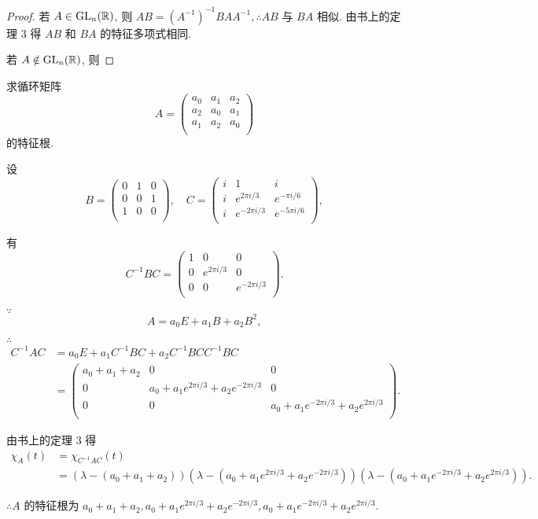 \documentclass{ctexart}
\begin{document}
\begin{proof}
    若 $A\in\operatorname{GL} _n(\mathbb{R})$, 则 $AB=(A^{-1})^{-1}BAA^{-1},\therefore AB$ 与 $BA$ 相似. 由书上的定理 3 得 $AB$ 和 $BA$ 的特征多项式相同.

    若 $A\notin\operatorname{GL} _n(\mathbb{R})$, 则 %
\end{proof}
\begin{exercise}%
    求循环矩阵
    \[A=\begin{pmatrix}
        a_0 & a_1 & a_2 \\
        a_2 & a_0 & a_1 \\
        a_1 & a_2 & a_0 \\
    \end{pmatrix}\]
    的特征根.
\end{exercise}
\begin{solution}
    设
    \[B=\begin{pmatrix}
        0 & 1 & 0 \\
        0 & 0 & 1 \\
        1 & 0 & 0 \\
    \end{pmatrix},\quad C=\begin{pmatrix}
        i & 1 & i \\
        i & e^{2\pi i/3} & e^{-\pi i/6} \\
        i & e^{-2\pi i/3} & e^{-5\pi i/6} \\
    \end{pmatrix},\]

    有
    \[C^{-1}BC=\begin{pmatrix}
        1 & 0 & 0 \\
        0 & e^{2\pi i/3} & 0 \\
        0 & 0 & e^{-2\pi i/3} \\
    \end{pmatrix}.\]

    $\because$
    \[A=a_0E+a_1B+a_2B^2,\]

    $\therefore$
    \begin{align*}
        C^{-1}AC & =a_0E+a_1C^{-1}BC+a_2C^{-1}BCC^{-1}BC \\
        & =\begin{pmatrix}
            a_0+a_1+a_2 & 0 & 0 \\
            0 & a_0+a_1e^{2\pi i/3}+a_2e^{-2\pi i/3} & 0 \\
            0 & 0 & a_0+a_1e^{-2\pi i/3}+a_2e^{2\pi i/3} \\
        \end{pmatrix}.
    \end{align*}

    由书上的定理 3 得
    \begin{align*}
        \chi_A(t) & =\chi_{C^{-1}AC}(t) \\
        & =(\lambda-(a_0+a_1+a_2))(\lambda-(a_0+a_1e^{2\pi i/3}+a_2e^{-2\pi i/3}))(\lambda-(a_0+a_1e^{-2\pi i/3}+a_2e^{2\pi i/3})).
    \end{align*}

    $\therefore A$ 的特征根为 $a_0+a_1+a_2,a_0+a_1e^{2\pi i/3}+a_2e^{-2\pi i/3},a_0+a_1e^{-2\pi i/3}+a_2e^{2\pi i/3}$.
\end{solution}
\end{document}
